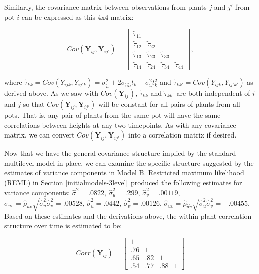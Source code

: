 \documentclass[
]{krantz}
\begin{document}
Similarly, the covariance matrix between observations from plants \(j\) and \(j'\) from pot \(i\) can be expressed as this 4x4 matrix:

\[  Cov(\textbf{Y}_{ij},\textbf{Y}_{ij'}) = \left[
          \begin{array}{cccc}
            \tilde{\tau}_{11} & & & \\
            \tilde{\tau}_{12} & \tilde{\tau}_{22} & & \\
            \tilde{\tau}_{13} & \tilde{\tau}_{23} & \tilde{\tau}_{33} & \\
            \tilde{\tau}_{14} & \tilde{\tau}_{24} & \tilde{\tau}_{34} & \tilde{\tau}_{44}
          \end{array} \right], \]

where \(\tilde{\tau}_{kk}=Cov(Y_{ijk},Y_{ij'k})=\sigma_{\tilde{u}}^{2}+2\sigma_{\tilde{u}\tilde{v}}t_{k}+\sigma_{\tilde{v}}^{2}t_{k}^{2}\) and \(\tilde{\tau}_{kk'}=Cov(Y_{ijk},Y_{ij'k'})\) as derived above. As we saw with \(Cov(\textbf{Y}_{ij})\), \(\tilde{\tau}_{kk}\) and \(\tilde{\tau}_{kk'}\) are both independent of \(i\) and \(j\) so that \(Cov(\textbf{Y}_{ij},\textbf{Y}_{ij'})\) will be constant for all pairs of plants from all pots. That is, any pair of plants from the same pot will have the same correlations between heights at any two timepoints. As with any covariance matrix, we can convert \(Cov(\textbf{Y}_{ij},\textbf{Y}_{ij'})\) into a correlation matrix if desired.

Now that we have the general covariance structure implied by the standard multilevel model in place, we can examine the specific structure suggested by the estimates of variance components in Model B. Restricted maximum likelihood (REML) in Section \ref{initialmodels-3level} produced the following estimates for variance components: \(\hat{\sigma}^2=.0822\), \(\hat{\sigma}_{u}^{2}=.299\), \(\hat{\sigma}_{v}^{2}=.00119\), \(\hat{\sigma}_{uv}=\hat{\rho}_{uv}\sqrt{\hat{\sigma}_{u}^{2}\hat{\sigma}_{v}^{2}}=.00528\), \(\hat{\sigma}_{\tilde{u}}^{2}=.0442\), \(\hat{\sigma}_{\tilde{v}}^{2}=.00126\), \(\hat{\sigma}_{\tilde{u}\tilde{v}}=\hat{\rho}_{\tilde{u}\tilde{v}}\sqrt{\hat{\sigma}_{\tilde{u}}^{2}\hat{\sigma}_{\tilde{v}}^{2}}=-.00455\). Based on these estimates and the derivations above, the within-plant correlation structure over time is estimated to be:

\[  Corr(\textbf{Y}_{ij}) = \left[
          \begin{array}{cccc}
            1 & & & \\
            .76 & 1 & & \\
            .65 & .82 & 1 & \\
            .54 & .77 & .88 & 1
          \end{array} \right] \]
\end{document}
